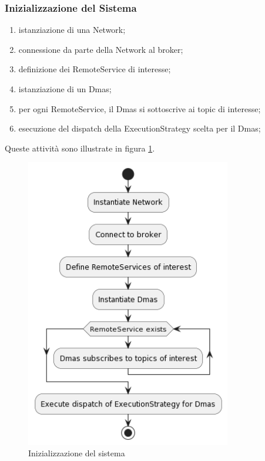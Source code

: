 \subsubsection{Inizializzazione del Sistema}

\begin{enumerate}
    \item istanziazione di una Network;
    \item connessione da parte della Network al broker;
    \item definizione dei RemoteService di interesse;
    \item istanziazione di un Dmas;
    \item per ogni RemoteService, il Dmas si sottoscrive ai topic di interesse;
    \item esecuzione del dispatch della ExecutionStrategy scelta per il Dmas;
\end{enumerate}

Queste attività sono illustrate in figura \ref{fig:initialization}.

\begin{figure}
    \centering
    \includegraphics[width=0.8\textwidth]{figures/activity-dmas.png}
    \caption{Inizializzazione del sistema}
    \label{fig:initialization}
\end{figure}

